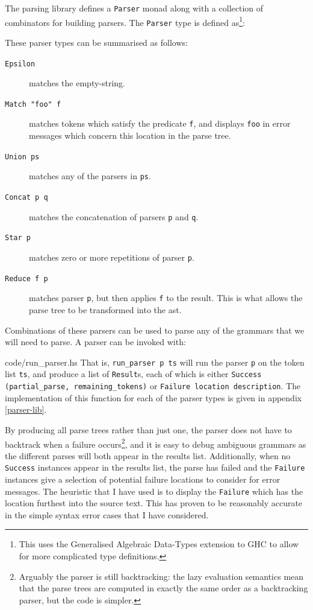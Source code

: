 The parsing library defines a \texttt{Parser} monad along with a collection of
combinators for building parsers. The \texttt{Parser} type is defined
as\footnote{This uses the Generalised Algebraic Data-Types extension to GHC to
allow for more complicated type definitions.}:

These parser types can be summarised as follows:
\begin{description}
  \item[\texttt{Epsilon}] matches the empty-string.
  \item[\texttt{Match "foo" f}] matches tokens which satisfy the predicate
    \texttt{f}, and displays \texttt{foo} in error messages which concern this
    location in the parse tree.
  \item[\texttt{Union ps}] matches any of the parsers in \texttt{ps}.
  \item[\texttt{Concat p q}] matches the concatenation of parsers \texttt{p} and
    \texttt{q}.
  \item[\texttt{Star p}] matches zero or more repetitions of parser \texttt{p}.
  \item[\texttt{Reduce f p}] matches parser \texttt{p}, but then applies
    \texttt{f} to the result. This is what allows the parse tree to be
    transformed into the \gls{ast}.
\end{description}
Combinations of these parsers can be used to parse any of the grammars that we
will need to parse. A parser can be invoked with:

    {code/run_parser.hs}
That is, \texttt{run\_parser p ts} will run the parser \texttt{p} on the token
list \texttt{ts}, and produce a list of \texttt{Result}s, each of which is
either \texttt{Success (partial\_parse, remaining\_tokens)} or
\texttt{Failure location description}. The implementation of this function for
each of the parser types is given in appendix \ref{parser-lib}.

By producing all parse trees rather than just one, the parser does not have to
backtrack when a failure occurs\footnote{Arguably the parser is still
backtracking: the lazy evaluation semantics mean that the parse trees are
computed in exactly the same order as a backtracking parser, but the code is
simpler.}, and it is easy to debug ambiguous grammars as the different parses
will both appear in the results list. Additionally, when no \texttt{Success}
instances appear in the results list, the parse has failed and the
\texttt{Failure} instances give a selection of potential failure locations to
consider for error messages. The heuristic that I have used is to display the
\texttt{Failure} which has the location furthest into the source text. This has
proven to be reasonably accurate in the simple syntax error cases that I have
considered.

